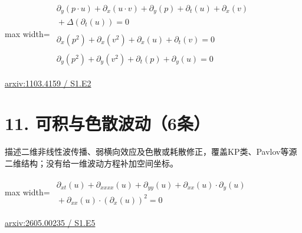 \documentclass[UTF8,10pt,a4paper,fontset=mac]{ctexart}
\begin{document}
\begin{minipage}{\linewidth}\begin{center}\begin{adjustbox}{max width=\linewidth}$\displaystyle\begin{gathered}\begin{gathered}\partial_{y}(p\cdot u)+\partial_{x}(u\cdot v)+\partial_{y}(p)+\partial_{t}(u)+\partial_{x}(v)\\[-1pt]{}+\Delta(\partial_{t}(u))=0\end{gathered}\\[5pt]\begin{gathered}\partial_{x}(p^{2})+\partial_{x}(v^{2})+\partial_{x}(u)+\partial_{t}(v)=0\end{gathered}\\[5pt]\begin{gathered}\partial_{y}(p^{2})+\partial_{y}(v^{2})+\partial_{t}(p)+\partial_{y}(u)=0\end{gathered}\end{gathered}$\end{adjustbox}\end{center}{\small\href{https://arxiv.org/html/1103.4159#S1.E2}{arxiv:1103.4159 / S1.E2}}\par\end{minipage}\par\vspace{6mm}

\section*{11. 可积与色散波动（6条）}
描述二维非线性波传播、弱横向效应及色散或耗散修正，覆盖KP类、Pavlov等源二维结构；没有给一维波动方程补加空间坐标。\par\medskip

\begin{minipage}{\linewidth}\begin{center}\begin{adjustbox}{max width=\linewidth}$\displaystyle\begin{gathered}\begin{gathered}\partial_{xt}(u)+\partial_{xxxx}(u)+\partial_{yy}(u)+\partial_{xx}(u)\cdot \partial_{y}(u)\\[-1pt]{}+\partial_{xx}(u)\cdot (\partial_{x}(u))^{2}=0\end{gathered}\end{gathered}$\end{adjustbox}\end{center}{\small\href{https://arxiv.org/html/2605.00235#S1.E5}{arxiv:2605.00235 / S1.E5}}\par\end{minipage}\par\vspace{6mm}
\end{document}
